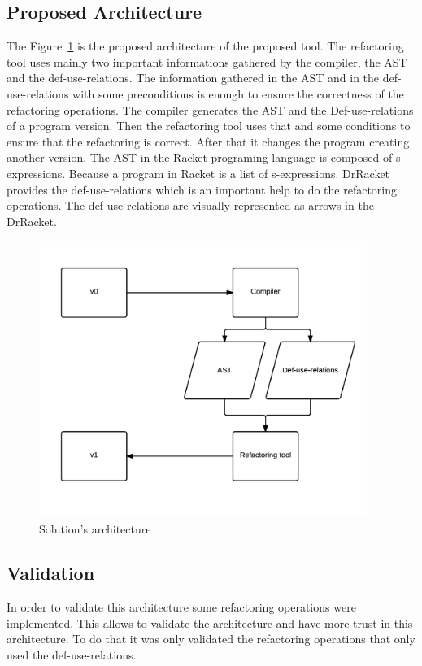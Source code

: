 \subsection{Proposed Architecture}

The Figure~\ref{fig:architecture} is the proposed architecture of the proposed tool. The refactoring tool uses mainly two important informations gathered by the compiler, the AST and the def-use-relations.
The information gathered in the AST and in the def-use-relations with some preconditions is enough to ensure the correctness of the refactoring operations.
The compiler generates the AST and the Def-use-relations of a program version. Then the refactoring tool uses that and some conditions to ensure that the refactoring is correct. After that it changes the program creating another version.
The AST in the Racket programing language is composed of s-expressions. Because a program in Racket is a list of s-expressions.
DrRacket provides the def-use-relations which is an important help to do the refactoring operations. The def-use-relations are visually represented as arrows in the DrRacket.

\begin{figure}[htbp]
	\centering
	\includegraphics[width=0.95\textwidth]{img/arquitectura.png}
	\caption{Solution's architecture}
	\label{fig:architecture}
\end{figure}


\subsection{Validation}
In order to validate this architecture some refactoring operations were implemented. 
This allows to validate the architecture and have more trust in this architecture.
To do that it was only validated the refactoring operations that only used the def-use-relations.

